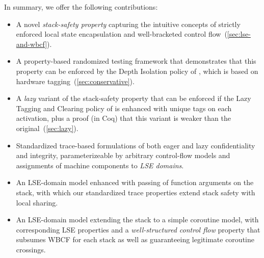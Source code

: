 \documentclass[acmsmall,review,anonymous]{acmart}\settopmatter{printfolios=true,printccs=false,printacmref=false}
\begin{document}
In summary, we offer the following contributions:
\begin{itemize}
\item
  A novel {\em stack-safety property} capturing the intuitive concepts of strictly enforced
  local state encapsulation and well-bracketed control flow~(\cref{sec:lse-and-wbcf}).
\item
  A property-based randomized testing framework that demonstrates that this
  property can be enforced by the Depth Isolation policy of
  \citet{DBLP:conf/sp/RoesslerD18}, which is based on hardware
  tagging~(\cref{sec:conservative}).
\item
  A {\em lazy} variant of the stack-safety property that can be enforced if the
  Lazy Tagging and Clearing policy of \citet{DBLP:conf/sp/RoesslerD18} is enhanced
  with unique tags on each activation, plus a proof (in Coq) that this
  variant is weaker than the original~(\cref{sec:lazy}).
\item
  Standardized trace-based formulations of both eager and lazy confidentiality and integrity,
  parameterizeable by arbitrary control-flow models and assignments of machine components
  to {\em LSE domains}.
\item
  An LSE-domain model enhanced with passing of function arguments on the stack, with which our
  standardized trace properties extend stack safety with local sharing.
\item
  An LSE-domain model extending the stack to a simple coroutine model, with corresponding LSE
  properties and a {\em well-structured control flow} property that subsumes WBCF for each
  stack as well as guaranteeing legitimate coroutine crossings.
%


\end{itemize}
\end{document}
